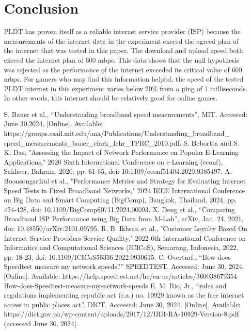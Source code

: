 \documentclass[conference]{IEEEtran}
\begin{document}
\section{Conclusion}
PLDT has proven itself as a reliable internet service provider (ISP) because the measurements of the internet data in the experiment exceed the agreed plan of the internet that was tested in this paper. 
The download and upload speed both exceed the internet plan of 600 mbps. This data shows that the null hypothesis was rejected as the performance of the internet exceeded its critical value of 600 mbps. 
For gamers who may find this information helpful, the speed of the tested PLDT internet in this experiment varies below 20\% from a ping of 1 milliseconds. 
In other words, this internet should be relatively good for online games.

\begin{thebibliography}{00}
 S. Bauer et al., “Understanding broadband speed measurements”, MIT. Accessed: June 30,2024. [Online]. Available: https://groups.csail.mit.edu/ana/Publications/Understanding\_broadband\_
speed\_measurements\_bauer\_clark\_lehr\_TPRC\_2010.pdf.
 S. Bebortta and S. K. Das, "Assessing the Impact of Network Performance on Popular E-Learning Applications," 2020 Sixth International Conference on e-Learning (econf), Sakheer, Bahrain, 2020, pp. 61-65, doi: 10.1109/econf51404.2020.9385497.
 A. Boonsongsrikul et al., "Performance Metrics and Strategy for Evaluating Internet Speed Tests in Fixed Broadband Networks," 2024 IEEE International Conference on Big Data and Smart Computing (BigComp), Bangkok, Thailand, 2024, pp. 424-428, doi: 10.1109/BigComp60711.2024.00093.
 X. Deng et al., “Comparing Broadband ISP Performance using Big Data from M-Lab”, arXiv, Jan. 24, 2021, doi: 10.48550/arXiv.2101.09795.
 R. B. Ikhsan et al., "Customer Loyalty Based On Internet Service Providers-Service Quality," 2022 6th International Conference on Informatics and Computational Sciences (ICICoS), Semarang, Indonesia, 2022, pp. 18-23, doi: 10.1109/ICICoS56336.2022.9930615.
 C. Overturf., “How does Speedtest measure my network speeds?” SPEEDTEST. Accessed: June 30, 2024. [Online]. Available: https://help.speedtest.net/hc/en-us/articles/360038679354-How-does-Speedtest-measure-my-network-speeds
 E. M. Rio, Jr.,  “rules and regulations implementing republic act (r.a.) no. 10929 known as the free internet access in public places act”. DICT. Accessed: June 30, 2024. [Online]. Available: https://dict.gov.ph/wp-content/uploads/2017/12/IRR-RA-10929-Version-8.pdf (accessed June 30, 2024).

\end{thebibliography}
\end{document}
